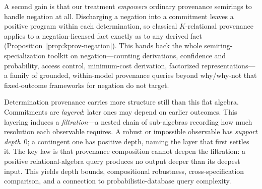 A second gain is that our treatment \emph{empowers} ordinary provenance
semirings to handle negation at all. Discharging a negation into a commitment
leaves a positive program within each determination, so classical
$K$-relational provenance~\cite{green2007provenance} applies to a
negation-licensed fact exactly as to any derived fact
(Proposition~\ref{prop:kprov-negation}). This hands back the whole
semiring-specialization toolkit on negation---counting derivations, confidence
and probability, access control, minimum-cost derivation, factorized
representations---a family of grounded, within-model provenance queries beyond
why/why-not that fixed-outcome frameworks for negation do not target.

Determination provenance carries more structure still than this flat algebra.
Commitments are \emph{layered}: later ones may depend on earlier outcomes.
This layering induces a \emph{filtration}---a nested chain of sub-algebras
recording how much resolution each observable requires. A robust or impossible
observable has \emph{support depth}~$0$; a contingent one has positive depth,
naming the layer that first settles it. The key law is that provenance
composition cannot deepen the filtration: a positive relational-algebra query
produces no output deeper than its deepest input. This yields depth bounds,
compositional robustness, cross-specification comparison, and a connection to
probabilistic-database query complexity.

